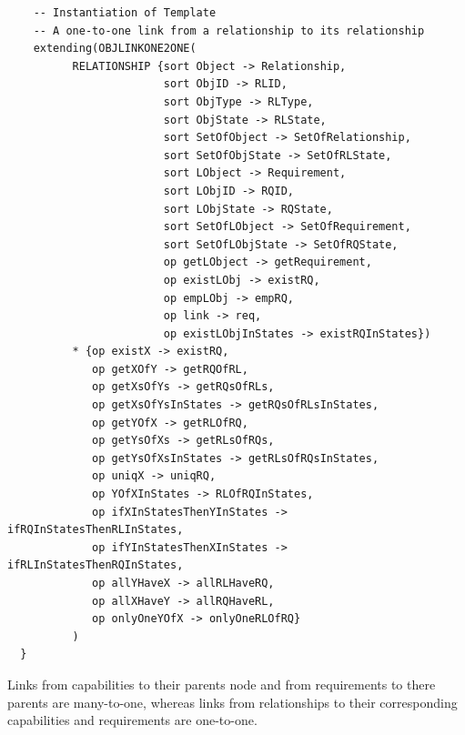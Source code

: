 \documentclass[12pt]{report}
\begin{document}
\begin{verbatim}
    -- Instantiation of Template
    -- A one-to-one link from a relationship to its relationship
    extending(OBJLINKONE2ONE(
          RELATIONSHIP {sort Object -> Relationship,
                        sort ObjID -> RLID,
                        sort ObjType -> RLType,
                        sort ObjState -> RLState,
                        sort SetOfObject -> SetOfRelationship,
                        sort SetOfObjState -> SetOfRLState,
                        sort LObject -> Requirement,
                        sort LObjID -> RQID,
                        sort LObjState -> RQState,
                        sort SetOfLObject -> SetOfRequirement,
                        sort SetOfLObjState -> SetOfRQState,
                        op getLObject -> getRequirement,
                        op existLObj -> existRQ,
                        op empLObj -> empRQ,
                        op link -> req,
                        op existLObjInStates -> existRQInStates})
          * {op existX -> existRQ,
             op getXOfY -> getRQOfRL,
             op getXsOfYs -> getRQsOfRLs,
             op getXsOfYsInStates -> getRQsOfRLsInStates,
             op getYOfX -> getRLOfRQ,
             op getYsOfXs -> getRLsOfRQs,
             op getYsOfXsInStates -> getRLsOfRQsInStates,
             op uniqX -> uniqRQ,
             op YOfXInStates -> RLOfRQInStates,
             op ifXInStatesThenYInStates -> ifRQInStatesThenRLInStates,
             op ifYInStatesThenXInStates -> ifRLInStatesThenRQInStates,
             op allYHaveX -> allRLHaveRQ,
             op allXHaveY -> allRQHaveRL,
             op onlyOneYOfX -> onlyOneRLOfRQ}
          )
  }
\end{verbatim}
\normalsize
Links from capabilities to their parents node and from requirements to
there parents are many-to-one, whereas links from relationships to
their corresponding capabilities and requirements are one-to-one.
\end{document}
